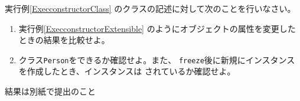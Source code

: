  \begin{Prob}\upshape\Must
  実行例\else\ref{ExecconstructorClass}\fi
  のクラスの記述に対して次のことを行いなさい。
  \begin{enumerate}
   \item 実行例\else\ref{ExecconstructorExtensible}\fi
         のようにオブジェクトの属性を変更したときの結果を比較せよ。
   \item クラス\texttt{Person}をできるか確認せよ。また、
         \texttt{freeze}後に新規にインスタンスを作成したとき、インスタンスは
         されているか確認せよ。
  \end{enumerate}
 \end{Prob}
\ifText 結果は別紙で提出のこと\fi